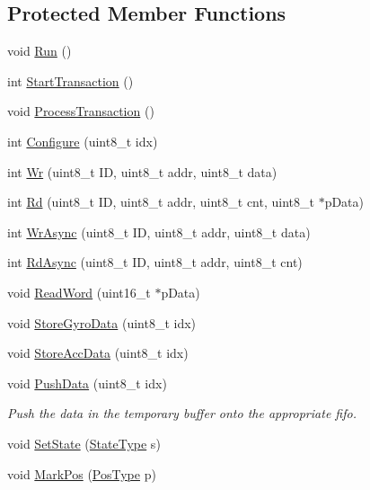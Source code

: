\subsection*{Protected Member Functions}
\begin{DoxyCompactItemize}
\item 
void \hyperlink{class_i_m_u_aadf38b912ad23374c4ee8e40fb9f3638}{Run} ()
\item 
int \hyperlink{class_i_m_u_a8dfecb837ea9fcf9d190423dca9beb7f}{StartTransaction} ()
\item 
void \hyperlink{class_i_m_u_ac39f14c617d4eea9de6175497744465a}{ProcessTransaction} ()
\item 
int \hyperlink{class_i_m_u_af4bede5261a1d6018c72782d8c54445e}{Configure} (uint8\_\-t idx)
\item 
int \hyperlink{class_i_m_u_af80eef2eb22d08faf697dd708b18303c}{Wr} (uint8\_\-t ID, uint8\_\-t addr, uint8\_\-t data)
\item 
int \hyperlink{class_i_m_u_ab6c8ef618465524c88a021e2206b2de5}{Rd} (uint8\_\-t ID, uint8\_\-t addr, uint8\_\-t cnt, uint8\_\-t $\ast$pData)
\item 
int \hyperlink{class_i_m_u_a2c38589ebcb357dfc8f987a5d41c845b}{WrAsync} (uint8\_\-t ID, uint8\_\-t addr, uint8\_\-t data)
\item 
int \hyperlink{class_i_m_u_ad39e85995898b9251032c89a3587974c}{RdAsync} (uint8\_\-t ID, uint8\_\-t addr, uint8\_\-t cnt)
\item 
void \hyperlink{class_i_m_u_a07362afd858bca1ce960f3809248e4e9}{ReadWord} (uint16\_\-t $\ast$pData)
\item 
void \hyperlink{class_i_m_u_a5b58d543be70886335e439a2b4f28a8e}{StoreGyroData} (uint8\_\-t idx)
\item 
void \hyperlink{class_i_m_u_ae9c290e496eb2a76aefc626c81fe4da9}{StoreAccData} (uint8\_\-t idx)
\item 
void \hyperlink{class_i_m_u_a14f3437170b38602f281b3f97d9ce129}{PushData} (uint8\_\-t idx)
\begin{DoxyCompactList}\small\item\em Push the data in the temporary buffer onto the appropriate fifo. \item\end{DoxyCompactList}\item 
void \hyperlink{class_i_m_u_a5d80a28d98df12c536f525b56b7e5abe}{SetState} (\hyperlink{class_i_m_u_a7b5e1bf1cf1407b3e4cf0dd2e18b523f}{StateType} s)
\item 
void \hyperlink{class_i_m_u_a7f9a7744a4fa3ea40da008cabd5da7b7}{MarkPos} (\hyperlink{class_i_m_u_ad01128d82debc1e4213affe4858f3144}{PosType} p)

\end{DoxyCompactItemize}
